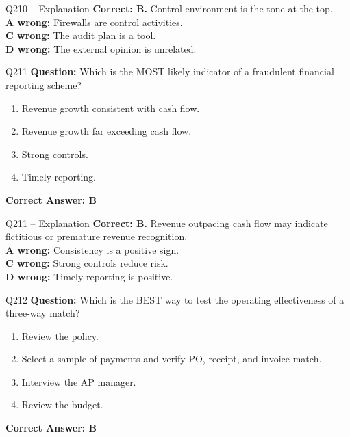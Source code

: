 \documentclass[aspectratio=169,10pt]{beamer}
\begin{document}
	\begin{frame}[t]{Q210 -- Explanation}
		\small
		\textbf{Correct: B.} Control environment is the tone at the top. \\[4pt]
		\textbf{A wrong:} Firewalls are control activities. \\[2pt]
		\textbf{C wrong:} The audit plan is a tool. \\[2pt]
		\textbf{D wrong:} The external opinion is unrelated.
	\end{frame}
	
	\begin{frame}[t]{Q211}
		\small
		\textbf{Question:} Which is the MOST likely indicator of a fraudulent financial reporting scheme?
		\begin{enumerate}[label=\Alph*.,itemsep=1pt,topsep=2pt]
			\item Revenue growth consistent with cash flow.
			\item Revenue growth far exceeding cash flow.
			\item Strong controls.
			\item Timely reporting.
		\end{enumerate}
		\vspace{4pt}
		\textbf{Correct Answer: B}
	\end{frame}
	
	\begin{frame}[t]{Q211 -- Explanation}
		\small
		\textbf{Correct: B.} Revenue outpacing cash flow may indicate fictitious or premature revenue recognition. \\[4pt]
		\textbf{A wrong:} Consistency is a positive sign. \\[2pt]
		\textbf{C wrong:} Strong controls reduce risk. \\[2pt]
		\textbf{D wrong:} Timely reporting is positive.
	\end{frame}
	
	\begin{frame}[t]{Q212}
		\small
		\textbf{Question:} Which is the BEST way to test the operating effectiveness of a three-way match?
		\begin{enumerate}[label=\Alph*.,itemsep=1pt,topsep=2pt]
			\item Review the policy.
			\item Select a sample of payments and verify PO, receipt, and invoice match.
			\item Interview the AP manager.
			\item Review the budget.
		\end{enumerate}
		\vspace{4pt}
		\textbf{Correct Answer: B}
	\end{frame}
	
\end{document}
